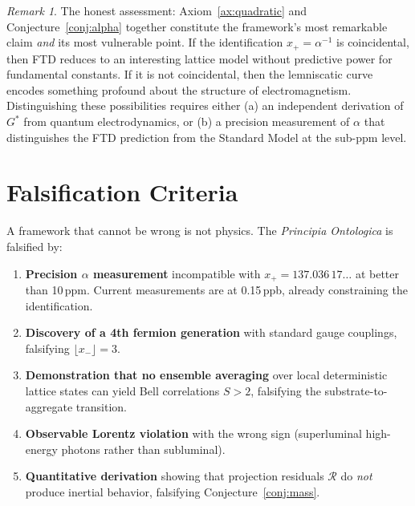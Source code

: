 \documentclass[11pt,twoside]{article}
\theoremstyle{definition}
\theoremstyle{plain}
\theoremstyle{remark}
\newtheorem{remark}[axiom]{Remark}
\newcommand{\Gstar}{G^{*}}
\begin{document}
\begin{remark}
The honest assessment: Axiom~\ref{ax:quadratic} and Conjecture~\ref{conj:alpha} together constitute the framework's most remarkable claim \emph{and} its most vulnerable point. If the identification $x_+ = \alpha^{-1}$ is coincidental, then FTD reduces to an interesting lattice model without predictive power for fundamental constants. If it is not coincidental, then the lemniscatic curve encodes something profound about the structure of electromagnetism. Distinguishing these possibilities requires either (a) an independent derivation of $\Gstar$ from quantum electrodynamics, or (b) a precision measurement of $\alpha$ that distinguishes the FTD prediction from the Standard Model at the sub-ppm level.
\end{remark}

\section{Falsification Criteria}

A framework that cannot be wrong is not physics. The \emph{Principia Ontologica} is falsified by:

\begin{enumerate}[leftmargin=2em]
    \item \textbf{Precision $\alpha$ measurement} incompatible with $x_+ = 137.036\,17\ldots$ at better than 10\,ppm. Current measurements are at 0.15\,ppb, already constraining the identification.

    \item \textbf{Discovery of a 4th fermion generation} with standard gauge couplings, falsifying $\lfloor x_- \rfloor = 3$.

    \item \textbf{Demonstration that no ensemble averaging} over local deterministic lattice states can yield Bell correlations $S > 2$, falsifying the substrate-to-aggregate transition.

    \item \textbf{Observable Lorentz violation} with the wrong sign (superluminal high-energy photons rather than subluminal).

    \item \textbf{Quantitative derivation} showing that projection residuals $\mathcal{R}$ do \emph{not} produce inertial behavior, falsifying Conjecture~\ref{conj:mass}.
\end{enumerate}
\end{document}
